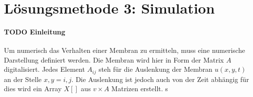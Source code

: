 %
%
%
\section{Lösungsmethode 3: Simulation 
	\label{kreismembran:section:teil4}}
\paragraph{TODO Einleitung}

Um numerisch das Verhalten einer Membran zu ermitteln, muss eine numerische Darstellung definiert werden.
Die Membran wird hier in Form der Matrix $  A $ digitalisiert.
Jedes Element  $ A_{ij} $ steh für die Auslenkung der Membran $ u(x,y,t) $ an der Stelle $ {x,y}={i,j} $.
Die Auslenkung ist jedoch auch von der Zeit abhängig für dies wird ein Array $  X[] $ aus $ v \times A $ Matrizen erstellt.
s
